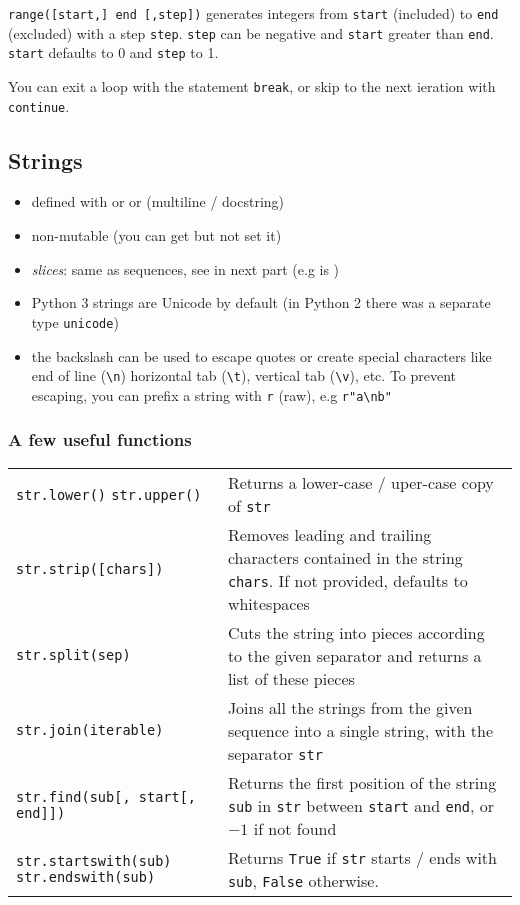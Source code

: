 \documentclass[twocolumn]{article}
\providecommand{\tightlist}{%
  \setlength{\itemsep}{0pt}\setlength{\parskip}{0pt}}
\begin{document}
\texttt{range([start,] end [,step{]})} generates integers from
\texttt{start} (included) to \texttt{end} (excluded) with a step
\texttt{step}. \texttt{step} can be negative and \texttt{start} greater
than \texttt{end}. \texttt{start} defaults to 0 and \texttt{step} to 1.

You can exit a loop with the statement \texttt{break}, or skip to the next ieration with \texttt{continue}.

\subsection{Strings}\label{strings}

\begin{itemize}
\tightlist
\item
  defined with  or
   or
   (multiline / docstring)
\item
  non-mutable (you can get  but not set it)
\item
  \textit{slices}: same as sequences, see in next part (e.g
   is )
\item
  Python 3 strings are Unicode by default (in Python 2 there was a
  separate type \texttt{unicode})
\item
  the backslash can be used to escape quotes or create special
  characters like end of line (\texttt{\textbackslash{}n}) horizontal
  tab (\texttt{\textbackslash{}t}), vertical tab
  (\texttt{\textbackslash{}v}), etc. To prevent escaping, you can prefix
  a string with \texttt{r} (raw), e.g
  \texttt{r"a\textbackslash{}nb"}
\end{itemize}

\subsubsection{A few useful functions}\label{strusefulfunc}

\begin{tabular}{|p{3.5cm}|p{5cm}|}
\hline
\texttt{str.lower()} \texttt{str.upper()} & Returns a lower-case / uper-case copy of \texttt{str} \\
\texttt{str.strip([chars])} & Removes leading and trailing characters contained in the string \texttt{chars}. If not provided, defaults to whitespaces \\
\texttt{str.split(sep)} & Cuts the string into pieces according to the given separator and returns a list of these pieces \\
\texttt{str.join(iterable)} & Joins all the strings from the given sequence into a single string, with the separator \texttt{str} \\
\texttt{str.find(sub[, start[, end]])} & Returns the first position of the string \texttt{sub} in \texttt{str} between \texttt{start} and \texttt{end}, or $-1$ if not found \\
\texttt{str.startswith(sub)} \texttt{str.endswith(sub)} & Returns \texttt{True} if \texttt{str} starts / ends with \texttt{sub}, \texttt{False} otherwise.\\ \hline
\end{tabular}
\end{document}
